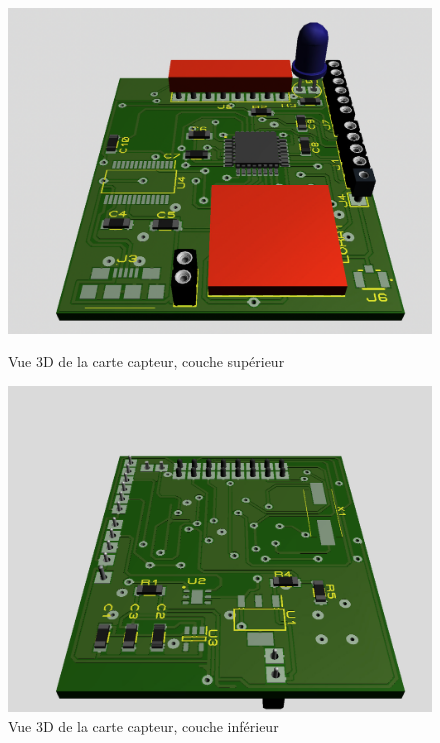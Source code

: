         \begin{figure}[!h]
            \centering
            \begin{minipage}{.48\linewidth}
                \begin{center}
                    \includegraphics[width=1\textwidth]{img/proteus/3d_top.png}
                    \caption{\label{fig:3d_top}Vue 3D de la carte capteur, couche supérieur}  
                \end{center}
            \end{minipage}\hfill
            \begin{minipage}{.48\linewidth}
                \begin{center}
                    \begin{center}
                        \includegraphics[width=1\textwidth]{img/proteus/3d_bottom.png}
                        \caption{\label{fig:3d_bottom}Vue 3D de la carte capteur, couche inférieur}  
                    \end{center}
                \end{center}
            \end{minipage}
        \end{figure}
